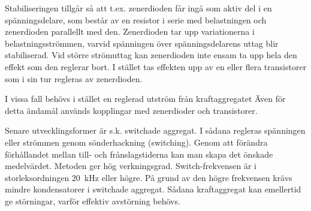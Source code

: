Stabiliseringen tillgår så att t.ex. zenerdioden får ingå som aktiv
del i en spänningsdelare, som består av en resistor i serie med
belastningen och zenerdioden parallellt med den. Zenerdioden tar upp
variationerna i belastningsströmmen, varvid spänningen över
spänningsdelarens uttag blir stabiliserad. Vid större strömuttag kan
zenerdioden inte ensam ta upp hela den effekt som den reglerar bort. I
stället tas effekten upp av en eller flera transistorer som i sin tur
regleras av zenerdioden.

I vissa fall behövs i stället en reglerad utström från kraftaggregatet
Även för detta ändamål används kopplingar med zenerdioder och
transistorer.

Senare utvecklingsformer är s.k. switchade aggregat. I sådana regleras
spänningen eller strömmen genom sönderhackning (switching). Genom att
förändra förhållandet mellan till- och frånslagstiderna kan man skapa
det önskade medelvärdet. Metoden ger hög
verkningsgrad. Switch-frekvensen är i storleksordningen 20~kHz eller
högre. På grund av den högre frekvensen krävs mindre kondensatorer i
switchade aggregat. Sådana kraftaggregat kan emellertid ge störningar,
varför effektiv avstörning behövs.
